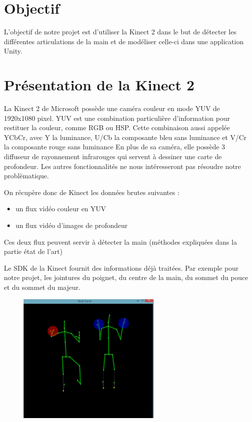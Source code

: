 \section{Objectif}
L'objectif de notre projet est d'utiliser la Kinect 2 dans le but de détecter les différentes articulations
de la main et de modéliser celle-ci dans une application Unity.

\section{Présentation de la Kinect 2}
La Kinect 2 de Microsoft possède une caméra couleur en mode YUV de 1920x1080 pixel.
YUV est une combination particulière d'information pour restituer la couleur, comme RGB ou HSP.
Cette combinaison aussi appelée YCbCr, avec Y la luminance, U/Cb la composante bleu sans luminance et V/Cr la composante rouge sans luminance
En plus de sa caméra, elle possède 3 diffuseur de rayonnement infrarouges qui servent à dessiner une carte de profondeur.
Les autres fonctionnalités ne nous intéresseront pas résoudre notre problèmatique.

On récupère donc de Kinect les données brutes suivantes : 
\begin{itemize}
 \item un flux vidéo couleur en YUV
 \item un flux vidéo d'images de profondeur
\end{itemize}

Ces deux flux peuvent servir à détecter la main (méthodes expliquées dans la partie état de l'art)

Le SDK de la Kinect fournit des informations déjà traitées. 
Par exemple pour notre projet, les jointures du poignet, du centre de la main, du sommet du pouce et du sommet du majeur.

\begin{figure}[!h]
\center
\includegraphics[width=7cm]{images/kinec2_skel.png}
\end{figure}

